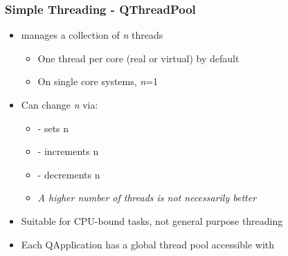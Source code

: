 \begin{slide}
\frametitle{Simple Threading - QThreadPool}

\begin{itemize}
\item {} manages a collection of {\it n} threads
  \begin{itemize}
  \item One thread per core (real or virtual) by default
  \item On single core systems, {\it n}=1 
  \end{itemize}
\item Can change {\it n} via:
  \begin{itemize}
  \item {} - sets n
  \item {} - increments n
  \item {} - decrements n
  \item \textit{A higher number of threads is not necessarily better}
  \end{itemize}
\item Suitable for CPU-bound tasks, not general purpose threading
\item Each QApplication has a global thread pool accessible with
\end{itemize}

\end{slide}



